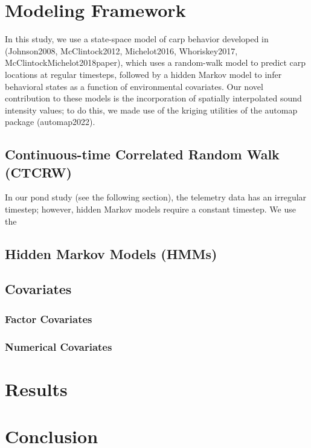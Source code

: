 \documentclass[12pt]{article}
\begin{document}
\section{Modeling Framework}

	In this study, we use a state-space model of carp behavior developed in (Johnson2008, McClintock2012, Michelot2016, Whoriskey2017, McClintockMichelot2018paper), which uses a random-walk model to predict carp locations at regular timesteps, followed by a hidden Markov model to infer behavioral states as a function of environmental covariates. Our novel contribution to these models is the incorporation of spatially interpolated sound intensity values; to do this, we made use of the kriging utilities of the automap package (automap2022).

	\subsection{Continuous-time Correlated Random Walk (CTCRW)}
	
	In our pond study (see the following section), the telemetry data has an irregular timestep; however, hidden Markov models require a constant timestep. We use the 

	\subsection{Hidden Markov Models (HMMs)}
	
	\subsection{Covariates}
	
		\subsubsection{Factor Covariates}
		
		\subsubsection{Numerical Covariates}

\section{Results}

\section{Conclusion}



\end{document}
